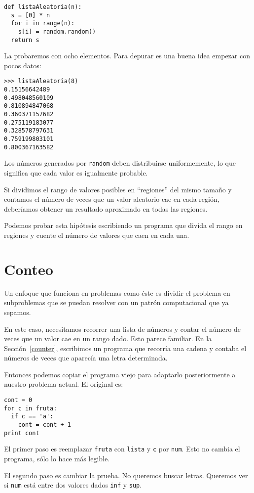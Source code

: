 \beforeverb
\begin{verbatim}
def listaAleatoria(n):
  s = [0] * n
  for i in range(n):
    s[i] = random.random()
  return s
\end{verbatim}
\afterverb
%
La probaremos con ocho elementos. Para depurar es una buena
idea empezar con pocos datos:

\beforeverb
\begin{verbatim}
>>> listaAleatoria(8)
0.15156642489
0.498048560109
0.810894847068
0.360371157682
0.275119183077
0.328578797631
0.759199803101
0.800367163582
\end{verbatim}
\afterverb
%
Los números generados por \texttt{random} deben distribuirse uniformemente,
lo que significa que cada valor es igualmente probable.

Si dividimos el rango de  valores posibles en ``regiones'' del mismo
tamaño y contamos el número de veces que un valor aleatorio cae
en cada región, deberíamos obtener un resultado aproximado en todas
las regiones.

Podemos probar esta hipótesis escribiendo un programa que
divida el rango en regiones y cuente el número de valores que caen
en cada una.


\section{Conteo}

Un enfoque que funciona en problemas como éste es dividir el problema
en subproblemas que se puedan resolver con un patrón computacional
que ya sepamos.

En este caso, necesitamos recorrer una lista de números y contar
el número de veces que un valor cae en un rango dado. Esto parece
familiar. En la Sección~\ref{counter}, escribimos un programa
que recorría una cadena y contaba el números de veces que aparecía
una letra determinada.

Entonces podemos copiar el programa viejo para adaptarlo posteriormente
a nuestro problema actual. El original es:

\beforeverb
\begin{verbatim}
cont = 0
for c in fruta:
  if c == 'a':
    cont = cont + 1
print cont
\end{verbatim}
\afterverb
%
El primer paso es reemplazar  \texttt{fruta} con \texttt{lista} y 
\texttt{c} por \texttt{num}.  Esto no cambia el programa, sólo lo hace
más legible.

El segundo paso es cambiar la prueba. No queremos buscar letras.
Queremos ver si  \texttt{num} está entre dos valores dados
\texttt{inf} y  \texttt{sup}.

